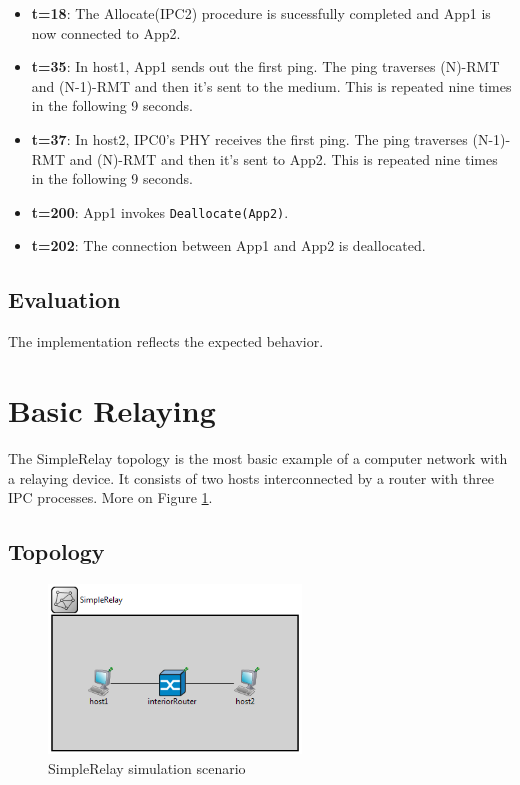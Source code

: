 \begin{itemize}
            \item \textbf{t=18}: The Allocate(IPC2) procedure is sucessfully completed and App1 is now connected to App2.

            \item \textbf{t=35}: In host1, App1 sends out the first ping. The ping traverses (N)-RMT and (N-1)-RMT and then it's sent to the medium. This is repeated nine times in the following 9 seconds.

            \item \textbf{t=37}: In host2, IPC0's PHY receives the first ping. The ping traverses (N-1)-RMT and (N)-RMT and then it's sent to App2. This is repeated nine times in the following 9 seconds.

            \item \textbf{t=200}: App1 invokes \texttt{Deallocate(App2)}.

            \item \textbf{t=202}: The connection between App1 and App2 is deallocated.
            \end{itemize}

        \subsection{Evaluation}

            The implementation reflects the expected behavior.

    \section{Basic Relaying}

        The SimpleRelay topology is the most basic example of a computer network with a relaying device. It consists of two hosts interconnected by a router with three IPC processes. More on Figure \ref{fig:examples:simplerelay}.

        \subsection{Topology}

        \begin{figure}[H]
            \begin{center}
                \includegraphics[width=0.6\textwidth]{fig/examples-simplerelay.png}
              \caption{SimpleRelay simulation scenario}
              \label{fig:examples:simplerelay}
            \end{center}
        \end{figure}

